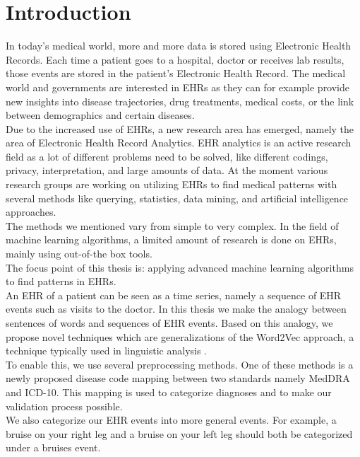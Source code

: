 \chapter{Introduction}
\label{cha:introduction}

In today's medical world, more and more data is stored using Electronic Health Records. Each time a patient goes to a hospital, doctor or receives lab results, those events are stored in the patient's Electronic Health Record. The medical world and governments are interested in EHRs as they can for example provide new insights into disease trajectories, drug treatments, medical costs, or the link between demographics and certain diseases. \\

Due to the increased use of EHRs, a new research area has emerged, namely the area of Electronic Health Record Analytics. EHR analytics is an active research field as a lot of different problems need to be solved, like different codings, privacy, interpretation, and large amounts of data. At the moment various research groups are working on utilizing EHRs to find medical patterns with several methods like querying, statistics, data mining, and artificial intelligence approaches. \\
The methods we mentioned vary from simple to very complex. In the field of machine learning algorithms, a limited amount of research is done on EHRs, mainly using out-of-the box tools. \\
The focus point of this thesis is: applying advanced machine learning algorithms to find patterns in EHRs. \\

An EHR of a patient can be seen as a time series, namely a sequence of EHR events such as visits to the doctor. In this thesis we make the analogy between sentences of words and sequences of EHR events. Based on this analogy, we propose novel techniques which are generalizations of the Word2Vec approach, a technique typically used in linguistic analysis \cite{w2vOriginal:article}. \\
To enable this, we use several preprocessing methods. One of these methods is a newly proposed disease code mapping between two standards namely MedDRA and ICD-10. This mapping is used to categorize diagnoses and to make our validation process possible.\\ 
We also categorize our EHR events into more general events. For example, a bruise on your right leg and a bruise on your left leg should both be categorized under a bruises event. \\

